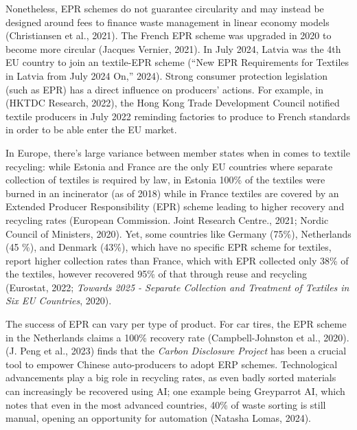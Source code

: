 \documentclass[
  12pt,
  letterpaper,
  DIV=11,
  numbers=noendperiod]{scrartcl}
\begin{document}
Nonetheless, EPR schemes do not guarantee circularity and may instead be
designed around fees to finance waste management in linear economy
models (Christiansen et al., 2021). The French EPR scheme was upgraded
in 2020 to become more circular (Jacques Vernier, 2021). In July 2024,
Latvia was the 4th EU country to join an textile-EPR scheme ({``New
{EPR} Requirements for Textiles in {Latvia} from {July} 2024 On,''}
2024). Strong consumer protection legislation (such as EPR) has a direct
influence on producers' actions. For example, in (HKTDC Research, 2022),
the Hong Kong Trade Development Council notified textile producers in
July 2022 reminding factories to produce to French standards in order to
be able enter the EU market.

In Europe, there's large variance between member states when in comes to
textile recycling: while Estonia and France are the only EU countries
where separate collection of textiles is required by law, in Estonia
100\% of the textiles were burned in an incinerator (as of 2018) while
in France textiles are covered by an Extended Producer Responsibility
(EPR) scheme leading to higher recovery and recycling rates (European
Commission. Joint Research Centre., 2021; Nordic Council of Ministers,
2020). Yet, some countries like Germany (75\%), Netherlands (45 \%), and
Denmark (43\%), which have no specific EPR scheme for textiles, report
higher collection rates than France, which with EPR collected only 38\%
of the textiles, however recovered 95\% of that through reuse and
recycling (Eurostat, 2022; \emph{Towards 2025 - Separate Collection and
Treatment of Textiles in Six {EU} Countries}, 2020).

The success of EPR can vary per type of product. For car tires, the EPR
scheme in the Netherlands claims a 100\% recovery rate
(Campbell-Johnston et al., 2020). (J. Peng et al., 2023) finds that the
\emph{Carbon Disclosure Project} has been a crucial tool to empower
Chinese auto-producers to adopt ERP schemes. Technological advancements
play a big role in recycling rates, as even badly sorted materials can
increasingly be recovered using AI; one example being Greyparrot AI,
which notes that even in the most advanced countries, 40\% of waste
sorting is still manual, opening an opportunity for automation (Natasha
Lomas, 2024).
\end{document}
